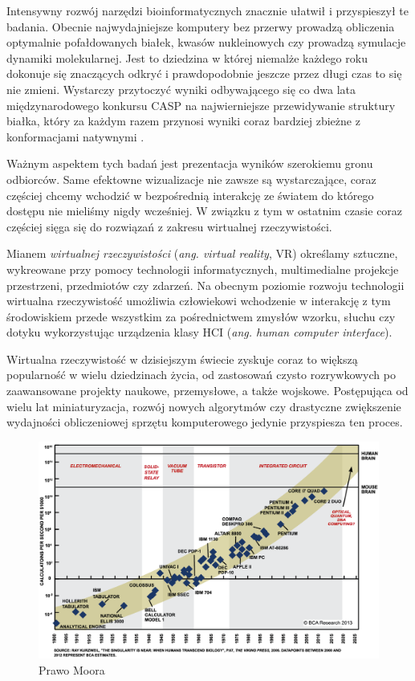 \documentclass[licencjacka]{pracamgr}
\begin{document}
Intensywny rozwój narzędzi bioinformatycznych znacznie ułatwił i przyspieszył te badania. Obecnie najwydajniejsze komputery bez przerwy prowadzą obliczenia optymalnie pofałdowanych białek, kwasów nukleinowych czy prowadzą symulacje dynamiki molekularnej. Jest to dziedzina w której niemalże każdego roku dokonuje się znaczących odkryć i prawdopodobnie jeszcze przez długi czas to się nie zmieni. Wystarczy przytoczyć wyniki odbywającego się co dwa lata międzynarodowego konkursu CASP na najwierniejsze przewidywanie struktury białka, który za każdym razem przynosi wyniki coraz bardziej zbieżne z konformacjami natywnymi \cite{casp}.

Ważnym aspektem tych badań jest prezentacja wyników szerokiemu gronu odbiorców. Same efektowne wizualizacje nie zawsze są wystarczające, coraz częściej chcemy wchodzić w bezpośrednią interakcję ze światem do którego dostępu nie mieliśmy nigdy wcześniej. W związku z tym w ostatnim czasie coraz częściej sięga się do rozwiązań z zakresu wirtualnej rzeczywistości. 

Mianem \textit{wirtualnej rzeczywistości} (\textit{ang. virtual reality}, VR) określamy sztuczne, wykreowane przy pomocy technologii informatycznych, multimedialne projekcje przestrzeni, przedmiotów czy zdarzeń. Na obecnym poziomie rozwoju technologii wirtualna rzeczywistość umożliwia człowiekowi wchodzenie w interakcję z tym środowiskiem przede wszystkim za pośrednictwem zmysłów wzorku, słuchu czy dotyku wykorzystując urządzenia klasy HCI (\textit{ang. human computer interface}). 

Wirtualna rzeczywistość w dzisiejszym świecie zyskuje coraz to większą popularność w wielu dziedzinach życia, od zastosowań czysto rozrywkowych po zaawansowane projekty naukowe, przemysłowe, a także wojskowe. Postępująca od wielu lat miniaturyzacja, rozwój nowych algorytmów czy drastyczne zwiększenie wydajności obliczeniowej sprzętu komputerowego jedynie przyspiesza ten proces.

\begin{figure}[H]
\centering
\includegraphics[scale=0.35,center]{MooresLaw}
\caption{Prawo Moora}
\end{figure}
\end{document}
